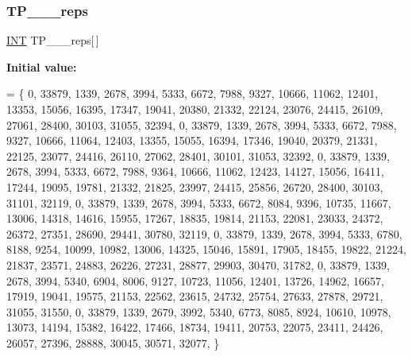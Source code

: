 \mbox{\label{data___t_p_8_c_aaad2ea58a0be1f1251dda2a7f36f0252}} 
\subsubsection{\texorpdfstring{T\+P\+\_\+\_\+\_\+reps}{TP\_3\_3\_reps}}
{\footnotesize\ttfamily \mbox{\hyperlink{galois_8h_a09fddde158a3a20bd2dcadb609de11dc}{I\+NT}} T\+P\+\_\+\_\+\_\+reps\mbox{[}$\,$\mbox{]}}

{\bfseries Initial value\+:}
\begin{DoxyCode}
= \{
    0, 33879, 1339, 2678, 3994, 5333, 6672, 7988, 9327, 10666, 11062, 12401, 13353, 15056, 16395, 17347, 
      19041, 20380, 21332, 22124, 23076, 24415, 26109, 27061, 28400, 30103, 31055, 32394, 
    0, 33879, 1339, 2678, 3994, 5333, 6672, 7988, 9327, 10666, 11064, 12403, 13355, 15055, 16394, 17346, 
      19040, 20379, 21331, 22125, 23077, 24416, 26110, 27062, 28401, 30101, 31053, 32392, 
    0, 33879, 1339, 2678, 3994, 5333, 6672, 7988, 9364, 10666, 11062, 12423, 14127, 15056, 16411, 17244, 
      19095, 19781, 21332, 21825, 23997, 24415, 25856, 26720, 28400, 30103, 31101, 32119, 
    0, 33879, 1339, 2678, 3994, 5333, 6672, 8084, 9396, 10735, 11667, 13006, 14318, 14616, 15955, 17267, 
      18835, 19814, 21153, 22081, 23033, 24372, 26372, 27351, 28690, 29441, 30780, 32119, 
    0, 33879, 1339, 2678, 3994, 5333, 6780, 8188, 9254, 10099, 10982, 13006, 14325, 15046, 15891, 17905, 
      18455, 19822, 21224, 21837, 23571, 24883, 26226, 27231, 28877, 29903, 30470, 31782, 
    0, 33879, 1339, 2678, 3994, 5340, 6904, 8006, 9127, 10723, 11056, 12401, 13726, 14962, 16657, 17919, 
      19041, 19575, 21153, 22562, 23615, 24732, 25754, 27633, 27878, 29721, 31055, 31550, 
    0, 33879, 1339, 2679, 3992, 5340, 6773, 8085, 8924, 10610, 10978, 13073, 14194, 15382, 16422, 17466, 
      18734, 19411, 20753, 22075, 23411, 24426, 26057, 27396, 28888, 30045, 30571, 32077, 
\}
\end{DoxyCode}
\mbox{\label{data___t_p_8_c_ab291acc74db90be1312d8d2599c3f6da}} 
